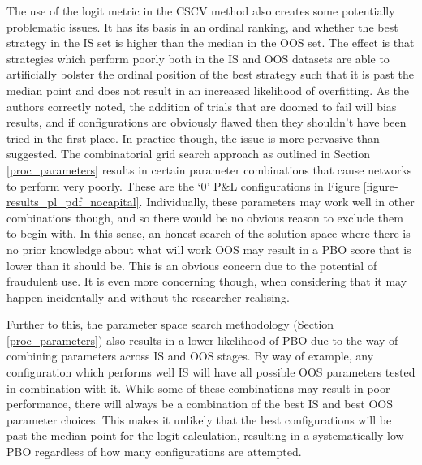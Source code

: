 \documentclass[a4paper,11pt,oneside]{article}
\theoremstyle{plain}
\theoremstyle{definition}
\begin{document}
	The use of the logit metric in the CSCV method also creates some potentially problematic issues. It has its basis in an ordinal ranking, and whether the best strategy in the IS set is higher than the median in the OOS set. The effect is that strategies which perform poorly both in the IS and OOS datasets are able to artificially bolster the ordinal position of the best strategy such that it is past the median point and does not result in an increased likelihood of overfitting. As the authors correctly noted, the addition of trials that are doomed to fail will bias results, and if configurations are obviously flawed then they shouldn't have been tried in the first place. In practice though, the issue is more pervasive than suggested. The combinatorial grid search approach as outlined in Section \ref{proc_parameters} results in certain parameter combinations that cause networks to perform very poorly. These are the `0' P\&L configurations in Figure \ref{figure-results_pl_pdf_nocapital}. Individually, these parameters may work well in other combinations though, and so there would be no obvious reason to exclude them to begin with. In this sense, an honest search of the solution space where there is no prior knowledge about what will work OOS may result in a PBO score that is lower than it should be. This is an obvious concern due to the potential of fraudulent use. It is even more concerning though, when considering that it may happen incidentally and without the researcher realising. \newline
	
	Further to this, the parameter space search methodology (Section \ref{proc_parameters}) also results in a lower likelihood of PBO due to the way of combining parameters across IS and OOS stages. By way of example, any configuration which performs well IS will have all possible OOS parameters tested in combination with it. While some of these combinations may result in poor performance, there will always be a combination of the best IS and best OOS parameter choices. This makes it unlikely that the best configurations will be past the median point for the logit calculation, resulting in a systematically low PBO regardless of how many configurations are attempted.\newline
	
\end{document}
